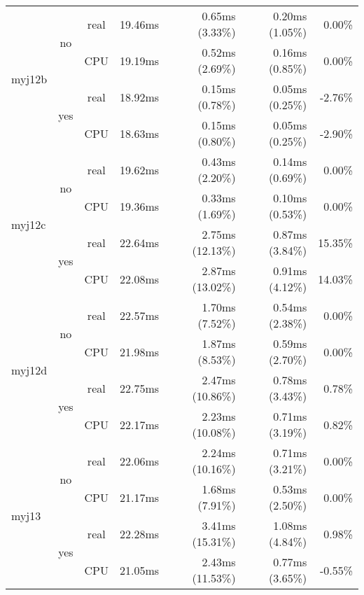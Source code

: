 \documentclass[en]{pracamgr}
\begin{document}
\begin{small}
\begin{longtable}{|l|c|c|r|r|r|r|}
\hline
\multirow{4}{*}{myj12b}   & \multirow{2}{*}{no}  & real & 19.46ms & 0.65ms (3.33\%) & 0.20ms (1.05\%) & 0.00\% \\*
                          &                      & CPU  & 19.19ms & 0.52ms (2.69\%) & 0.16ms (0.85\%) & 0.00\% \\*
                          \cline{2-7}
                          & \multirow{2}{*}{yes} & real & 18.92ms & 0.15ms (0.78\%) & 0.05ms (0.25\%) & -2.76\% \\*
                          &                      & CPU  & 18.63ms & 0.15ms (0.80\%) & 0.05ms (0.25\%) & -2.90\% \\
\hline
\multirow{4}{*}{myj12c}   & \multirow{2}{*}{no}  & real & 19.62ms & 0.43ms (2.20\%) & 0.14ms (0.69\%) & 0.00\% \\*
                          &                      & CPU  & 19.36ms & 0.33ms (1.69\%) & 0.10ms (0.53\%) & 0.00\% \\*
                          \cline{2-7}
                          & \multirow{2}{*}{yes} & real & 22.64ms & 2.75ms (12.13\%) & 0.87ms (3.84\%) & 15.35\% \\*
                          &                      & CPU  & 22.08ms & 2.87ms (13.02\%) & 0.91ms (4.12\%) & 14.03\% \\
\hline
\multirow{4}{*}{myj12d}   & \multirow{2}{*}{no}  & real & 22.57ms & 1.70ms (7.52\%) & 0.54ms (2.38\%) & 0.00\% \\*
                          &                      & CPU  & 21.98ms & 1.87ms (8.53\%) & 0.59ms (2.70\%) & 0.00\% \\*
                          \cline{2-7}
                          & \multirow{2}{*}{yes} & real & 22.75ms & 2.47ms (10.86\%) & 0.78ms (3.43\%) & 0.78\% \\*
                          &                      & CPU  & 22.17ms & 2.23ms (10.08\%) & 0.71ms (3.19\%) & 0.82\% \\
\hline
\multirow{4}{*}{myj13}    & \multirow{2}{*}{no}  & real & 22.06ms & 2.24ms (10.16\%) & 0.71ms (3.21\%) & 0.00\% \\*
                          &                      & CPU  & 21.17ms & 1.68ms (7.91\%) & 0.53ms (2.50\%) & 0.00\% \\*
                          \cline{2-7}
                          & \multirow{2}{*}{yes} & real & 22.28ms & 3.41ms (15.31\%) & 1.08ms (4.84\%) & 0.98\% \\*
                          &                      & CPU  & 21.05ms & 2.43ms (11.53\%) & 0.77ms (3.65\%) & -0.55\% \\

\end{longtable}
\end{small}
\end{document}

